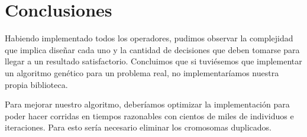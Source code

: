\documentclass[a4paper,12pt]{article}
\begin{document}
\section{Conclusiones}

Habiendo implementado todos los operadores, pudimos observar la complejidad que implica diseñar cada uno y la cantidad de decisiones que deben tomarse para llegar a un resultado satisfactorio.
Concluimos que si tuviésemos que implementar un algoritmo genético para un problema real, no implementaríamos nuestra propia biblioteca.

Para mejorar nuestro algoritmo, deberíamos optimizar la implementación para poder hacer corridas en tiempos razonables con cientos de miles de individuos e iteraciones.
Para esto sería necesario eliminar los cromosomas duplicados.


\printbibliography
\end{document}
